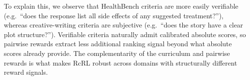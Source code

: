 \documentclass{article}
\theoremstyle{plain}
\theoremstyle{definition}
\theoremstyle{remark}
\begin{document}
To explain this, we observe that HealthBench criteria are more easily verifiable (e.g.\ ``does the response list all side effects of any suggested treatment?''), whereas creative-writing criteria are subjective (e.g.\ ``does the story have a clear plot structure?''). Verifiable criteria naturally admit calibrated absolute scores, so pairwise rewards extract less additional ranking signal beyond what absolute scores already provide. The complementarity of the curriculum and pairwise rewards is what makes RcRL robust across domains with structurally different reward signals.



\newcommand{\prefbar}[2]{%
  \begin{tikzpicture}[baseline=-0.3em]
    \def\barwidth{3.8cm}
    \def\barheight{0.38cm}
    \def\baseline{#1}
    \def\ours{#2}
    
    \pgfmathsetmacro{\basewidth}{\baseline/100*\barwidth}
    \pgfmathsetmacro{\ourswidth}{\ours/100*\barwidth}
    
    \fill[colorbaseline, opacity=0.15] (0,0) rectangle (\basewidth pt,\barheight);
    \draw[colorbaseline, line width=1.2pt] (0,0) rectangle (\basewidth pt,\barheight);
    
    \fill[colorours, opacity=0.15] (\basewidth pt,0) rectangle (\barwidth,\barheight);
    \draw[colorours, line width=1.2pt] (\basewidth pt,0) rectangle (\barwidth,\barheight);
    
    \draw[black!50, line width=1pt, dashed] (0.5*\barwidth,0) -- (0.5*\barwidth,\barheight);
    
    
    \node[anchor=south west, font=\scriptsize\bfseries, text=colorours] 
      at (\barwidth+0.08cm, 0.02cm) {#2\%};
  \end{tikzpicture}%
}
\end{document}
